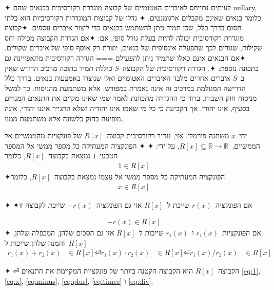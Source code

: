 ✦ לעיתים נתייחס לאיברים האטומיים של קבוצה מוגדרת רקורסיבית כבנאים שהם nullary,
כלומר בנאים שאינם מקבלים ארגומנטים.
✦ גדלן של קבוצות המוגדרות רקורסיביות הוא בלתי חסום בדרך כלל, שכן תמיד ניתן
להשתמש בבנאים כדי ליצור איברים נוספים.
✦קבוצה מוגדרת רקורסיבית יכולה להיות בעלת גודל סופי, אם:
✦אם הגדרת הקבוצה מכילה יחס שקילות, שגורים לכך שהפעלה אינסופית של
בנאים, יוצרת רק אוסף סופי של איברים שקולים.
✦אם הבנאים אינם כאלו שתמיד ניתן להפעילם
===
הגדרה רקורסיבית מתאפייינת גם בתכונה נוספת:
✦. הגדרה רקורסיבית של הקבוצה~$S$ כוללת תמיד בתוכה מרכיב
הדורש שאין ב~$S$ איברים
אחרים מלבד האיברים האטומיים ואלו שנוצרו באמצעות בנאים. בדרך כלל הדרישה המגולמת
במרכיב זה אינה נאמרת במפורש, אלא משתמעת מהניסוח. כך למשל מניסוח חוק השבות, ברור
כי ההגדרה מתכוונת לאמר שמי שאינו מקיים
את התנאים המנויים בסעיף, אינו יהודי. אך הקביעה כי כל מי שאמו אינו יהודיה ושלא
התגייר איננו יהודי, אינה מופיעה בחוק כלשונה אלא משתמעת ממנו.

\begin{Definition}
  \label{definition:rationals}
  יהי~$x$ משתנה פורמלי. אזי, נגדיר רקורסיבית קבוצה~$R[x]$ של פונקציות מהממשיים אל הממשיים,~$R[x]⊆ℝ→ℝ$,
  על ידי:
  ✦
  ✦ הפונקציה המעתיקה כל מספר ממשי אל המספר הטבעי~$1$ נמצאת בקבוצה~$R[x]$, כלומר
  \begin{align}
    \label{eq:1}
    1∈R[x]
  \end{align}
  ✦הפונקציה המעתיקה כל מספר ממשי אל עצמו נמצאת בקבוצה~$R[x]$, כלומר
  \begin{align}
    \label{eq:x}
    x∈R[x]
  \end{align}

  ✦
  ✦אם הפונקציה~$r(x)$ שייכת ל~$R[x]$ אזי גם הפונקציה~$-r(x)$ שייכת לקבוצה זו

  \begin{align}
    \label{eq:minus}
    -r(x)∈R[x]
  \end{align}
  ✦ אם הפונקציות~$r₁(x)$ ו~$r₂(x)$ שייכות ל~$R[x]$ אזי גם הסכום שלהן, המכפלה
  שלהן, והמנה שלהן שייכות ל~$R[x]$
  \begin{align}
    r₁(x)+r₂(x) & ∈R[x] \label{eq:plus} ⏎
    r₁(x)·r₂(x) & ∈R[x] \label{eq:times} ⏎
    r₁(x)/r₂(x) & ∈R[x] \label{eq:div}
  \end{align}

  ✦ ⏎ הקבוצה~$R[x]$ היא הקבוצה הקטנה ביותר של פונקציות המקיימת את התנאים
  \cref{eq:1},
  \cref{eq:x},
  \cref{eq:minus},
  \cref{eq:plus},
  \cref{eq:times}
  ו
  \cref{eq:div}.
\end{Definition}

